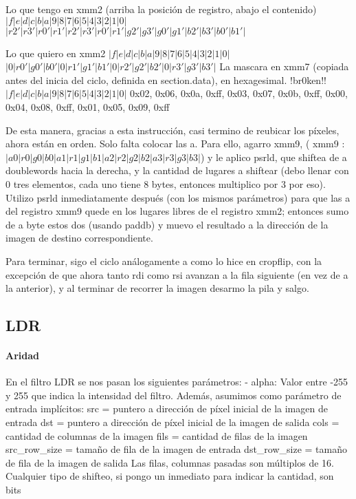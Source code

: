 \documentclass[a4paper]{article}
\begin{document}
    Lo que tengo en xmm2 (arriba la posición de registro, abajo el contenido)
    \hfill \break
 $|  f  |  e  |  d  |  c  |  b  |  a  |  9  |  8  |  7  |  6  |  5  |  4  |  3  |  2  |  1  |  0  |$
 \hfill \break
$ | r2' | r3' | r0' | r1' | r2' | r3' | r0' | r1' | g2' | g3' | g0' | g1' | b2' | b3' | b0' | b1' | $
 \hfill \break
 
 Lo que quiero en xmm2  
 \hfill \break
 $|  f  |  e  |  d  |  c  |  b  |  a  |  9  |  8  |  7  |  6  |  5  |  4  |  3  |  2  |  1  |  0  |$
 \hfill \break
$ |  0  | r0' | g0' | b0' |  0  | r1' | g1' | b1' |  0  | r2' | g2' | b2' |  0  | r3' | g3' | b3' |$
\hfill \break
La mascara en xmm7 (copiada antes del inicia del ciclo, definida en section.data), en hexagesimal.
\hfill \!!br0ken!!
$ |  f  |  e  |  d  |  c  |  b  |  a  |  9  |  8  |  7  |  6  |  5  |  4  |  3  |  2  |  1  |  0  |$
\hfill \break
 0x02, 0x06, 0x0a, 0xff, 0x03, 0x07, 0x0b, 0xff, 0x00, 0x04, 0x08, 0xff, 0x01, 0x05, 0x09, 0xff
 \hfill \break
 
 
De esta manera, gracias a esta instrucción, casi termino de reubicar los píxeles, ahora están en orden. Solo falta colocar las a. Para ello, agarro xmm9, 
( xmm9 : $| a0 | r0 | g0 | b0 | a1 | r1 | g1 | b1 | a2 | r2 | g2 | b2 | a3 | r3 | g3 | b3 |$) y le aplico  psrld, que shiftea de a doublewords  hacia la derecha, y  
 la cantidad de lugares a shiftear (debo llenar con 0 tres elementos, cada uno tiene 8 bytes, entonces multiplico por 3 por  eso).
 \hfill \break 
 Utilizo psrld inmediatamente después (con los mismos parámetros) para que las a del registro xmm9 quede en los lugares libres de el registro xmm2; entonces sumo de a byte estos dos (usando paddb) y muevo el resultado a la dirección de la imagen de destino correspondiente.
 \hfill \break
 
 Para terminar, sigo el ciclo análogamente a como lo hice en cropflip, con la excepción de que ahora tanto rdi como rsi avanzan a la fila siguiente (en vez de  a la anterior), y al terminar de recorrer la imagen desarmo la pila y salgo.
 \hfill \break
 
 
        
        
          
   
     
    
    
        
\subsection{LDR}
\paragraph{\textbf{Aridad}}
\hfill \break
En el filtro LDR se nos pasan los siguientes parámetros:
- alpha: Valor entre -255 y 255 que indica la intensidad del filtro.
Además, asumimos como parámetro de entrada implícitos:
src = puntero a dirección de píxel inicial de la imagen de entrada
\hfill \break
dst = puntero a dirección de píxel inicial de la imagen de salida
\hfill \break
cols = cantidad de columnas de la imagen
fils = cantidad de filas de la imagen
src_row_size = tamaño de fila de la imagen de entrada
dst_row_size = tamaño de fila de la imagen de salida 
Las filas, columnas pasadas son múltiplos de 16. Cualquier tipo de shifteo, si pongo un inmediato para indicar la cantidad, son bits
\end{document}

